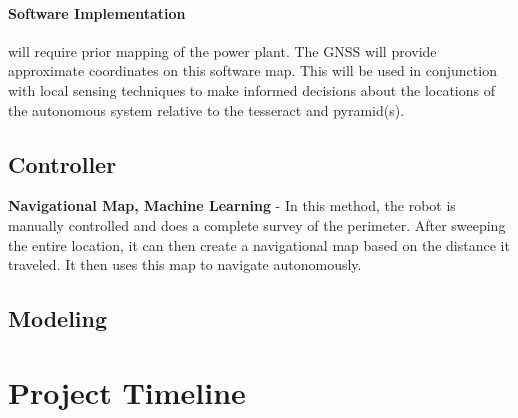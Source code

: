 \documentclass[12pt]{article}
\begin{document}
\paragraph{Software Implementation} will require prior mapping of the power plant. The GNSS will provide approximate coordinates on this software map. This will be used in conjunction with local sensing techniques to make informed decisions about the locations of the autonomous system relative to the tesseract and pyramid(s).


\subsection{Controller}

\textbf{Navigational Map, Machine Learning} - In this method, the robot is manually controlled and does a complete survey of the perimeter. After sweeping the entire location, it can then create a navigational map based on the distance it traveled. It then uses this map to navigate autonomously.

\subsection{Modeling}

\clearpage
\section{Project Timeline}
\end{document}
